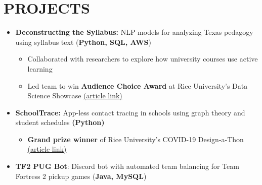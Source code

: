\documentclass[11pt,a4paper,roman]{moderncv}        %
\begin{document}
\section{PROJECTS}
{\begin{itemize}
    \item \normalsize{\textbf{Deconstructing the Syllabus:}} \small{NLP models for analyzing Texas pedagogy using syllabus text (\textbf{Python, SQL, AWS})}
    \begin{itemize}
        \item Collaborated with \href{https://openstax.org/}{\underline{}} researchers to explore how university courses use active learning
        \item Led team to win \textbf{Audience Choice Award} at Rice University's Data Science Showcase \href{https://www.youtube.com/watch?v=JsUe3temhcw}{(\underline{article link})}
    \end{itemize}
    \item \normalsize{\textbf{SchoolTrace:}} \small{App-less contact tracing in schools using graph theory and student schedules \textbf{(Python)}}
    \begin{itemize}
        \item \textbf{Grand prize winner} of Rice University's COVID-19 Design-a-Thon \href{http://news.rice.edu/2020/07/21/contact-tracing-software-takes-top-prize-at-rice-design-a-thon/}{(\underline{article link})}
    \end{itemize}
    
    \item \normalsize{\textbf{TF2 PUG Bot}:} \small{Discord bot with automated team balancing for Team Fortress 2 pickup games (\textbf{Java, MySQL})}
    
\end{itemize}

}
\\
\\
\nocite{*}

\end{document}
